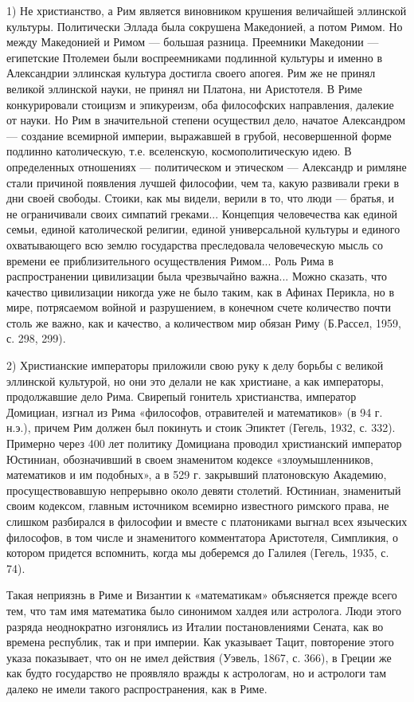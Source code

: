 1) Не христианство, а Рим является виновником крушения величайшей
эллинской культуры. Политически Эллада была сокрушена Македонией, а
потом Римом. Но между Македонией и Римом --- большая разница.
Преемники Македонии --- египетские Птолемеи были воспреемниками
подлинной культуры и именно в Александрии эллинская культура достигла
своего апогея. Рим же не принял великой эллинской науки, не принял ни
Платона, ни Аристотеля. В Риме конкурировали стоицизм и эпикуреизм,
оба философских направления, далекие от науки. Но Рим в значительной
степени осуществил дело, начатое Александром --- создание всемирной
империи, выражавшей в грубой, несовершенной форме подлинно
католическую, т.е. вселенскую, космополитическую идею. В определенных
отношениях --- политическом и этическом --- Александр и римляне стали
причиной появления лучшей философии, чем та, какую развивали греки в
дни своей свободы. Стоики, как мы видели, верили в то, что люди ---
братья, и не ограничивали своих симпатий греками... Концепция
человечества как единой семьи, единой католической религии, единой
универсальной культуры и единого охватывающего всю землю государства
преследовала человеческую мысль со времени ее приблизительного
осуществления Римом... Роль Рима в распространении цивилизации была
чрезвычайно важна... Можно сказать, что качество цивилизации никогда
уже не было таким, как в Афинах Перикла, но в мире, потрясаемом войной
и разрушением, в конечном счете количество почти столь же важно, как и
качество, а количеством мир обязан Риму (Б.Рассел, 1959, с. 298, 299).

2) Христианские императоры приложили свою руку к делу борьбы с великой
эллинской культурой, но они это делали не как христиане, а как
императоры, продолжавшие дело Рима. Свирепый гонитель христианства,
император Домициан, изгнал из Рима «философов, отравителей и
математиков» (в 94 г. н.э.), причем Рим должен был покинуть и стоик
Эпиктет (Гегель, 1932, с. 332). Примерно через 400 лет политику
Домициана проводил христианский император Юстиниан, обозначивший в
своем знаменитом кодексе «злоумышленников, математиков и им подобных»,
а в 529 г. закрывший платоновскую Академию, просуществовавшую
непрерывно около девяти столетий. Юстиниан, знаменитый своим кодексом,
главным источником всемирно известного римского права, не слишком
разбирался в философии и вместе с платониками выгнал всех языческих
философов, в том числе и знаменитого комментатора Аристотеля,
Симпликия, о котором придется вспомнить, когда мы доберемся до Галилея
(Гегель, 1935, с. 74).

Такая неприязнь в Риме и Византии к «математикам» объясняется прежде
всего тем, что там имя математика было синонимом халдея или астролога.
Люди этого разряда неоднократно изгонялись из Италии постановлениями
Сената, как во времена республик, так и при империи. Как указывает
Тацит, повторение этого указа показывает, что он не имел действия
(Уэвель, 1867, с. 366), в Греции же как будто государство не проявляло
вражды к астрологам, но и астрологи там далеко не имели такого
распространения, как в Риме.

